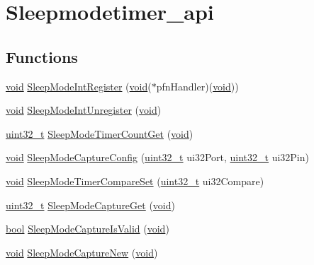 \hypertarget{group__sleepmodetimer__api}{}\section{Sleepmodetimer\+\_\+api}
\label{group__sleepmodetimer__api}
\subsection*{Functions}
\begin{DoxyCompactItemize}
\item 
\hyperlink{usb__devapi_8h_afabf60e7f57651d6d595a02c75f07cd0}{void} \hyperlink{group__sleepmodetimer__api_ga631d7ae9067f7291b8170428698b3cf9}{Sleep\+Mode\+Int\+Register} (\hyperlink{usb__devapi_8h_afabf60e7f57651d6d595a02c75f07cd0}{void}($\ast$pfn\+Handler)(\hyperlink{usb__devapi_8h_afabf60e7f57651d6d595a02c75f07cd0}{void}))
\item 
\hyperlink{usb__devapi_8h_afabf60e7f57651d6d595a02c75f07cd0}{void} \hyperlink{group__sleepmodetimer__api_ga83865113e47a6b079357dceac7ca1fe9}{Sleep\+Mode\+Int\+Unregister} (\hyperlink{usb__devapi_8h_afabf60e7f57651d6d595a02c75f07cd0}{void})
\item 
\hyperlink{_p_e___types_8h_a33594304e786b158f3fb30289278f5af}{uint32\+\_\+t} \hyperlink{group__sleepmodetimer__api_gae3691d4aec602cecdcfc0a4a4cc6fdd3}{Sleep\+Mode\+Timer\+Count\+Get} (\hyperlink{usb__devapi_8h_afabf60e7f57651d6d595a02c75f07cd0}{void})
\item 
\hyperlink{usb__devapi_8h_afabf60e7f57651d6d595a02c75f07cd0}{void} \hyperlink{group__sleepmodetimer__api_ga41bbbe3dac841146ce74f2b013b579ea}{Sleep\+Mode\+Capture\+Config} (\hyperlink{_p_e___types_8h_a33594304e786b158f3fb30289278f5af}{uint32\+\_\+t} ui32\+Port, \hyperlink{_p_e___types_8h_a33594304e786b158f3fb30289278f5af}{uint32\+\_\+t} ui32\+Pin)
\item 
\hyperlink{usb__devapi_8h_afabf60e7f57651d6d595a02c75f07cd0}{void} \hyperlink{group__sleepmodetimer__api_ga4bef09f83a400cb46f1a19079f90c5cb}{Sleep\+Mode\+Timer\+Compare\+Set} (\hyperlink{_p_e___types_8h_a33594304e786b158f3fb30289278f5af}{uint32\+\_\+t} ui32\+Compare)
\item 
\hyperlink{_p_e___types_8h_a33594304e786b158f3fb30289278f5af}{uint32\+\_\+t} \hyperlink{group__sleepmodetimer__api_ga5749fe84d6df5b4a5cf08929b6ecff33}{Sleep\+Mode\+Capture\+Get} (\hyperlink{usb__devapi_8h_afabf60e7f57651d6d595a02c75f07cd0}{void})
\item 
\hyperlink{_p_e___types_8h_a97a80ca1602ebf2303258971a2c938e2}{bool} \hyperlink{group__sleepmodetimer__api_gacd93966396c811ba406adc36db4d7ebe}{Sleep\+Mode\+Capture\+Is\+Valid} (\hyperlink{usb__devapi_8h_afabf60e7f57651d6d595a02c75f07cd0}{void})
\item 
\hyperlink{usb__devapi_8h_afabf60e7f57651d6d595a02c75f07cd0}{void} \hyperlink{group__sleepmodetimer__api_ga983cdcab7d4105968ee063ad2432608a}{Sleep\+Mode\+Capture\+New} (\hyperlink{usb__devapi_8h_afabf60e7f57651d6d595a02c75f07cd0}{void})
\end{DoxyCompactItemize}


